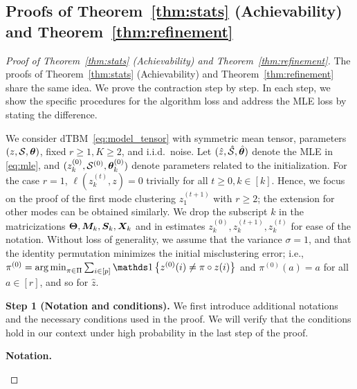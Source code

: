 \documentclass[journal]{IEEEtran}
\theoremstyle{definition}
\theoremstyle{definition}
\newcommand{\offf}[1]{\left\{#1\right\}}
\begin{document}
\subsection{Proofs of Theorem~\ref{thm:stats} (Achievability) and Theorem~\ref{thm:refinement}}\label{sec:statprove2}


\begin{proof}[Proof of Theorem~\ref{thm:stats} (Achievability) and Theorem~\ref{thm:refinement}]



The proofs of Theorem~\ref{thm:stats} (Achievability) and Theorem~\ref{thm:refinement} share the same idea. We prove the contraction step by step. In each step, we show the specific procedures for the algorithm loss and address the MLE loss by stating the difference. 

We consider dTBM~\eqref{eq:model_tensor} with symmetric mean tensor, parameters $(z, \mathcal{S}, \boldsymbol{\theta})$, {fixed $r\geq 1, K \geq 2$}, and i.i.d.\ noise.  Let $(\hat z,\hat {\mathcal{S}},  \hat {\boldsymbol{\theta}})$ denote the MLE in \eqref{eq:mle}, and $(z^{(0)}_k, \mathcal{S}^{(0)}, \boldsymbol{\theta}^{(0)}_k)$ denote parameters related to the initialization.  {For the case $r = 1$, $\ell(z^{(t)}_k, z) = 0$ trivially for all $t \geq 0, k \in [k]$. Hence, we focus on the proof of the first mode clustering $z^{(t+1)}_1$ with $r \geq 2$}; 
the extension for other modes can be obtained similarly. We drop the subscript $k$ in the matricizations $\boldsymbol{\Theta}, \bm M_k, \bm S_k, \bm X_k$ and in estimates $z^{(0)}_k, z^{(t+1)}_k, z^{(t)}_k$ for ease of the notation.  Without loss of generality, we assume that the variance $\sigma = 1$, and that the identity permutation minimizes the initial misclustering error; i.e., $\pi^{(0)} = \argmin_{\pi \in \Pi} \sum_{i \in [p]}\ind \offf{z^{(0)}(i) \neq \pi \circ z(i) }$ and $\pi^{(0)}(a) = a$ for all $ a \in [r]$, and so for $\hat z$. 




{\bf Step 1 (Notation and conditions).} We first introduce additional notations and the necessary conditions used in the proof. We will verify that the conditions hold in our context under high probability in the last step of the proof. 

{
  

\textbf{Notation.}
\begin{enumerate}[wide]


\end{enumerate}}
\end{proof}
\end{document}
